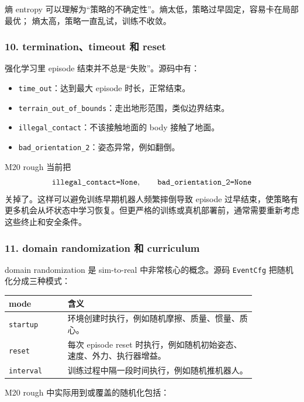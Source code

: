 \documentclass[UTF8,11pt,a4paper]{ctexart}
\begin{document}
熵 entropy 可以理解为“策略的不确定性”。熵太低，策略过早固定，容易卡在局部最优；
熵太高，策略一直乱试，训练不收敛。

\subsubsection{10. termination、timeout 和 reset}

强化学习里 episode 结束并不总是“失败”。源码中有：

\begin{itemize}
  \item \texttt{time\_out}：达到最大 episode 时长，正常结束。
  \item \texttt{terrain\_out\_of\_bounds}：走出地形范围，类似边界结束。
  \item \texttt{illegal\_contact}：不该接触地面的 body 接触了地面。
  \item \texttt{bad\_orientation\_2}：姿态异常，例如翻倒。
\end{itemize}

M20 rough 当前把
\[
\text{\texttt{illegal\_contact=None}},\qquad
\text{\texttt{bad\_orientation\_2=None}}
\]
关掉了。这样可以避免训练早期机器人频繁摔倒导致 episode 过早结束，使策略有更多机会从坏状态中学习恢复。但更严格的训练或真机部署前，通常需要重新考虑这些终止和安全条件。

\subsubsection{11. domain randomization 和 curriculum}

domain randomization 是 sim-to-real 中非常核心的概念。源码 \texttt{EventCfg} 把随机化分成三种模式：

\begin{center}
\renewcommand{\arraystretch}{1.25}
\begin{tabular}{p{0.20\linewidth}p{0.64\linewidth}}
\toprule
\textbf{mode} & \textbf{含义}\\
\midrule
\texttt{startup} & 环境创建时执行，例如随机摩擦、质量、惯量、质心。\\
\texttt{reset} & 每次 episode reset 时执行，例如随机初始姿态、速度、外力、执行器增益。\\
\texttt{interval} & 训练过程中隔一段时间执行，例如随机推机器人。\\
\bottomrule
\end{tabular}
\end{center}

M20 rough 中实际用到或覆盖的随机化包括：
\end{document}
